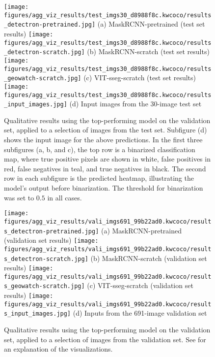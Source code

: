 \documentclass[10pt,twocolumn,letterpaper]{article}
\begin{document}
\begin{figure*}[ht]
\centering
\texttt{[image: figures/agg\_viz\_results/test\_imgs30\_d8988f8c.kwcoco/results\_detectron-pretrained.jpg]}%
\hfill
(a) MaskRCNN-pretrained (test set results)
\texttt{[image: figures/agg\_viz\_results/test\_imgs30\_d8988f8c.kwcoco/results\_detectron-scratch.jpg]}%
\hfill
(b) MaskRCNN-scratch (test set results)
\texttt{[image: figures/agg\_viz\_results/test\_imgs30\_d8988f8c.kwcoco/results\_geowatch-scratch.jpg]}%
\hfill
(c) VIT-sseg-scratch (test set results)
\texttt{[image: figures/agg\_viz\_results/test\_imgs30\_d8988f8c.kwcoco/results\_input\_images.jpg]}%
\hfill
(d) Input images from the 30-image test set
\caption[]{
    Qualitative results using the top-performing model on the validation set, applied to a selection of
      images from the test set.
    Subfigure (d) shows the input image for the above predictions.
    In the first three subfigures (a, b, and c), the top row is a binarized classification map, where true
      positive pixels are shown in white, false positives in red, false negatives in teal, and true negatives
      in black.
    The second row in each subfigure is the predicted heatmap, illustrating the model's output before
      binarization.
    The threshold for binarization was set to $0.5$ in all cases.
}
\label{fig:test_results_all_models}
\end{figure*}


\begin{figure*}[ht]
\centering
\texttt{[image: figures/agg\_viz\_results/vali\_imgs691\_99b22ad0.kwcoco/results\_detectron-pretrained.jpg]}%
\hfill
(a) MaskRCNN-pretrained (validation set results)
\texttt{[image: figures/agg\_viz\_results/vali\_imgs691\_99b22ad0.kwcoco/results\_detectron-scratch.jpg]}%
\hfill
(b) MaskRCNN-scratch (validation set results)
\texttt{[image: figures/agg\_viz\_results/vali\_imgs691\_99b22ad0.kwcoco/results\_geowatch-scratch.jpg]}%
\hfill
(c) VIT-sseg-scratch (validation set results)
\texttt{[image: figures/agg\_viz\_results/vali\_imgs691\_99b22ad0.kwcoco/results\_input\_images.jpg]}%
\hfill
(d) Inputs from the 691-image validation set
\caption[]{
    Qualitative results using the top-performing model on the validation set, applied to a selection of
      images from the validation set. See  for an explanation of the visualizations.
}
\label{fig:vali_results_all_models}
\end{figure*}
\end{document}
